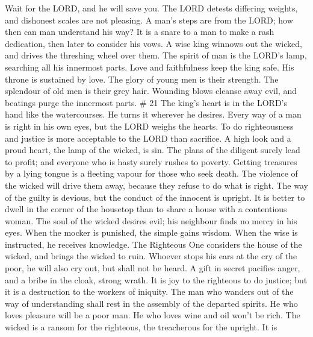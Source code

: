 Wait for the LORD, and he will save you.  The LORD
detests differing weights, and dishonest scales are not pleasing.
 A man's steps are from the LORD; how then can man
understand his way?  It is a snare to a man to make a
rash dedication, then later to consider his vows.  A wise
king winnows out the wicked, and drives the threshing wheel over them.
 The spirit of man is the LORD's lamp, searching all his
innermost parts.  Love and faithfulness keep the king
safe. His throne is sustained by love.  The glory of
young men is their strength. The splendour of old men is their grey
hair.  Wounding blows cleanse away evil, and beatings
purge the innermost parts. \# 21  The king's heart is in
the LORD's hand like the watercourses. He turns it wherever he desires.
 Every way of a man is right in his own eyes, but the LORD
weighs the hearts.  To do righteousness and justice is
more acceptable to the LORD than sacrifice.  A high look
and a proud heart, the lamp of the wicked, is sin.  The
plans of the diligent surely lead to profit; and everyone who is hasty
surely rushes to poverty.  Getting treasures by a lying
tongue is a fleeting vapour for those who seek death.  The
violence of the wicked will drive them away, because they refuse to do
what is right.  The way of the guilty is devious, but the
conduct of the innocent is upright.  It is better to dwell
in the corner of the housetop than to share a house with a contentious
woman.  The soul of the wicked desires evil; his
neighbour finds no mercy in his eyes.  When the mocker is
punished, the simple gains wisdom. When the wise is instructed, he
receives knowledge.  The Righteous One considers the
house of the wicked, and brings the wicked to ruin. 
Whoever stops his ears at the cry of the poor, he will also cry out, but
shall not be heard.  A gift in secret pacifies anger, and
a bribe in the cloak, strong wrath.  It is joy to the
righteous to do justice; but it is a destruction to the workers of
iniquity.  The man who wanders out of the way of
understanding shall rest in the assembly of the departed spirits.
 He who loves pleasure will be a poor man. He who loves
wine and oil won't be rich.  The wicked is a ransom for
the righteous, the treacherous for the upright.  It is
